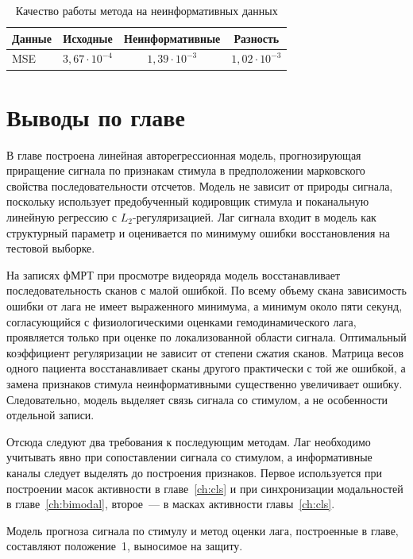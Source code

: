 \begin{table}[h!]
    \centering
    \caption{Качество работы метода на неинформативных данных}\label{table:delay_random}
    \begin{tabular}{lccc}
        \toprule
        Данные & Исходные & Неинформативные & Разность \\
        \midrule
        MSE & $3{,}67 \cdot 10^{-4}$ & $1{,}39 \cdot 10^{-3}$ & $1{,}02 \cdot 10^{-3}$ \\
        \bottomrule
    \end{tabular}
\end{table}

\section{Выводы по главе}\label{sec4:delay_disc}
В главе построена линейная авторегрессионная модель, прогнозирующая приращение сигнала по признакам стимула в предположении марковского свойства последовательности отсчетов. Модель не зависит от природы сигнала, поскольку использует предобученный кодировщик стимула и поканальную линейную регрессию с $L_2$-регуляризацией. Лаг сигнала входит в модель как структурный параметр и оценивается по минимуму ошибки восстановления на тестовой выборке.

На записях фМРТ при просмотре видеоряда модель восстанавливает последовательность сканов с малой ошибкой. По всему объему скана зависимость ошибки от лага не имеет выраженного минимума, а минимум около пяти секунд, согласующийся с физиологическими оценками гемодинамического лага, проявляется только при оценке по локализованной области сигнала. Оптимальный коэффициент регуляризации не зависит от степени сжатия сканов. Матрица весов одного пациента восстанавливает сканы другого практически с той же ошибкой, а замена признаков стимула неинформативными существенно увеличивает ошибку. Следовательно, модель выделяет связь сигнала со стимулом, а не особенности отдельной записи.

Отсюда следуют два требования к последующим методам. Лаг необходимо учитывать явно при сопоставлении сигнала со стимулом, а информативные каналы следует выделять до построения признаков. Первое используется при построении масок активности в главе~\ref{ch:cls} и при синхронизации модальностей в главе~\ref{ch:bimodal}, второе~--- в масках активности главы~\ref{ch:cls}.

Модель прогноза сигнала по стимулу и метод оценки лага, построенные в главе, составляют положение~1, выносимое на защиту.

